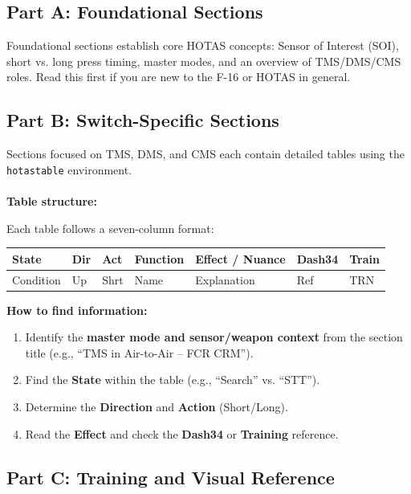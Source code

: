\documentclass[11pt, a4paper, twoside]{report}
\begin{document}
\subsection{Part A: Foundational Sections}
\label{sec:C1-S5-S1}

Foundational sections establish core HOTAS concepts: Sensor of Interest (SOI), short vs. long press timing, master modes, and an overview of TMS/DMS/CMS roles. Read this first if you are new to the F-16 or HOTAS in general.

\subsection{Part B: Switch-Specific Sections}
\label{sec:C1-S5-S2}


Sections focused on TMS, DMS, and CMS each contain detailed tables using the \texttt{hotastable} environment.
\\\\
\textbf{Table structure:}

Each table follows a seven-column format:

\begin{center}
\begin{tabular}{L{1.6cm} L{1.0cm} L{1.0cm} L{3.4cm} L{5.8cm} L{1.4cm} L{1.4cm}}
\toprule
\textbf{State} & \textbf{Dir} & \textbf{Act} & \textbf{Function} & \textbf{Effect / Nuance} & \textbf{Dash34} & \textbf{Train} \\
\midrule
Condition & Up & Shrt & Name & Explanation & Ref & TRN \\
\bottomrule
\end{tabular}
\end{center}

\textbf{How to find information:}

\begin{enumerate}
\item Identify the \textbf{master mode and sensor/weapon context} from the section title (e.g., ``TMS in Air-to-Air -- FCR CRM'').
\item Find the \textbf{State} within the table (e.g., ``Search'' vs. ``STT'').
\item Determine the \textbf{Direction} and \textbf{Action} (Short/Long).
\item Read the \textbf{Effect} and check the \textbf{Dash34} or \textbf{Training} reference.
\end{enumerate}

\subsection{Part C: Training and Visual Reference}
\label{sec:C1-S5-S3}
\end{document}
